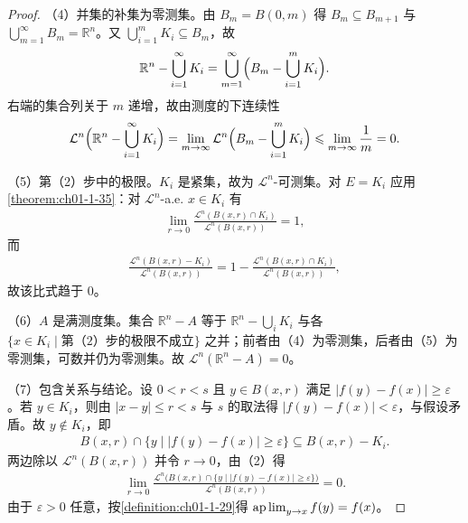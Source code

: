 \documentclass[../../main.tex]{subfiles}%
\begin{document}
\begin{proof}
（4）并集的补集为零测集。由 $B_m=B(0,m)$ 得 $B_m\subseteq B_{m+1}$ 与 $\bigcup_{m=1}^{\infty}B_m=\mathbb{R}^n$。又 $\bigcup_{i=1}^{m}K_i\subseteq B_m$，故
\begin{align*}
\mathbb{R}^n-\bigcup_{i=1}^{\infty}K_i=\bigcup_{m=1}^{\infty}\Bigl(B_m-\bigcup_{i=1}^{m}K_i\Bigr).
\end{align*}
右端的集合列关于 $m$ 递增，故由测度的下连续性
\begin{align*}
\mathcal{L}^{n}\Bigl(\mathbb{R}^n-\bigcup_{i=1}^{\infty}K_i\Bigr)
=\lim_{m\to\infty}\mathcal{L}^{n}\Bigl(B_m-\bigcup_{i=1}^{m}K_i\Bigr)
\leqslant\lim_{m\to\infty}\frac{1}{m}=0 .
\end{align*}

（5）第（2）步中的极限。$K_i$ 是紧集，故为 $\mathcal{L}^{n}$-可测集。对 $E=K_i$ 应用\cref{theorem:ch01-1-35}：对 $\mathcal{L}^{n}$-a.e. $x\in K_i$ 有%
\begin{align*}
\lim_{r\to0}\frac{\mathcal{L}^{n}(B(x,r)\cap K_i)}{\mathcal{L}^{n}(B(x,r))}=1 ,
\end{align*}
而
\begin{align*}
\frac{\mathcal{L}^{n}(B(x,r)-K_i)}{\mathcal{L}^{n}(B(x,r))}
=1-\frac{\mathcal{L}^{n}(B(x,r)\cap K_i)}{\mathcal{L}^{n}(B(x,r))} ,
\end{align*}
故该比式趋于 $0$。%

（6）$A$ 是满测度集。集合 $\mathbb{R}^n-A$ 等于 $\mathbb{R}^n-\bigcup_{i}K_i$ 与各 $\{x\in K_i\mid\text{第（2）步的极限不成立}\}$ 之并；前者由（4）为零测集，后者由（5）为零测集，可数并仍为零测集。故 $\mathcal{L}^{n}(\mathbb{R}^n-A)=0$。

（7）包含关系与结论。设 $0<r<s$ 且 $y\in B(x,r)$ 满足 $\lvert f(y)-f(x)\rvert\geqslant\varepsilon$。若 $y\in K_i$，则由 $\lvert x-y\rvert\leqslant r<s$ 与 $s$ 的取法得 $\lvert f(y)-f(x)\rvert<\varepsilon$，与假设矛盾。故 $y\notin K_i$，即
\begin{align*}
B(x,r)\cap\{y\mid\lvert f(y)-f(x)\rvert\geqslant\varepsilon\}\subseteq B(x,r)-K_i .
\end{align*}
两边除以 $\mathcal{L}^{n}(B(x,r))$ 并令 $r\to0$，由（2）得
\begin{align*}
\lim_{r\to0}\frac{\mathcal{L}^{n}\bigl(B(x,r)\cap\{y\mid\lvert f(y)-f(x)\rvert\geqslant\varepsilon\}\bigr)}{\mathcal{L}^{n}(B(x,r))}=0 .
\end{align*}
由于 $\varepsilon>0$ 任意，按\cref{definition:ch01-1-29}得 $\operatorname*{ap\,lim}_{y\to x}f(y)=f(x)$。%
\end{proof}
\end{document}
